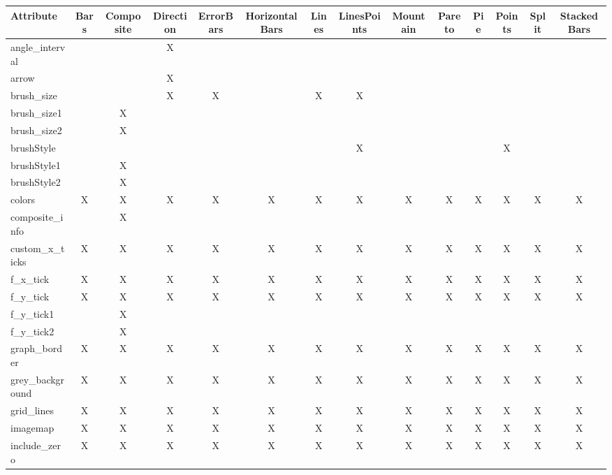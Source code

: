 {
\begin{table}
\tiny
\begin{tabular}{|l|c|c|c|c|c|c|c|c|c|c|c|c|c|}
\hline
Attribute & Bars& Composite& Direction& ErrorBars& HorizontalBars& Lines& LinesPoints& Mountain& Pareto& Pie& Points& Split& StackedBars \\
\hline
angle\_interval        &   &   & X &   &   &   &   &   &   &   &   &   &   \\
arrow                  &   &   & X &   &   &   &   &   &   &   &   &   &   \\
brush\_size            &   &   & X & X &   & X & X &   &   &   &   &   &   \\
brush\_size1           &   & X &   &   &   &   &   &   &   &   &   &   &   \\
brush\_size2           &   & X &   &   &   &   &   &   &   &   &   &   &   \\
brushStyle             &   &   &   &   &   &   & X &   &   &   & X &   &   \\
brushStyle1            &   & X &   &   &   &   &   &   &   &   &   &   &   \\
brushStyle2            &   & X &   &   &   &   &   &   &   &   &   &   &   \\
colors                 & X & X & X & X & X & X & X & X & X & X & X & X & X \\
composite\_info        &   & X &   &   &   &   &   &   &   &   &   &   &   \\
custom\_x\_ticks       & X & X & X & X & X & X & X & X & X & X & X & X & X \\
f\_x\_tick             & X & X & X & X & X & X & X & X & X & X & X & X & X \\
f\_y\_tick             & X & X & X & X & X & X & X & X & X & X & X & X & X \\
f\_y\_tick1            &   & X &   &   &   &   &   &   &   &   &   &   &   \\
f\_y\_tick2            &   & X &   &   &   &   &   &   &   &   &   &   &   \\
graph\_border          & X & X & X & X & X & X & X & X & X & X & X & X & X \\
grey\_background       & X & X & X & X & X & X & X & X & X & X & X & X & X \\
grid\_lines            & X & X & X & X & X & X & X & X & X & X & X & X & X \\
imagemap               & X & X & X & X & X & X & X & X & X & X & X & X & X \\
include\_zero          & X & X & X & X & X & X & X & X & X & X & X & X & X \\

\end{tabular}
\end{table}}
